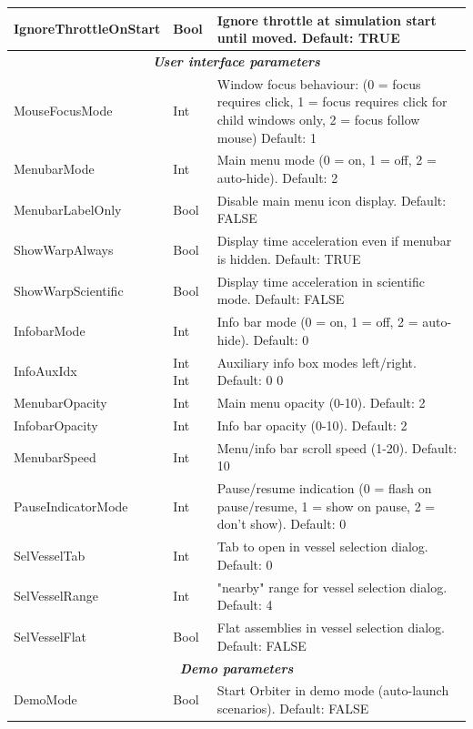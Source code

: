 \documentclass[Orbiter User Manual.tex]{subfiles}
\begin{document}
\begin{longtable}{ |p{}|p{}|p{}| }
	\hline\rule{0pt}{2ex}
	IgnoreThrottleOnStart & Bool & Ignore throttle at simulation start until moved. Default: TRUE\\
	\hline
	\multicolumn{3}{|c|}{\rule{0pt}{2ex}\textbf{\textit{User interface parameters}}}\\
	\hline\rule{0pt}{2ex}
	MouseFocusMode & Int & Window focus behaviour: (0 = focus requires click, 1 = focus requires click for child windows only, 2 = focus follow mouse) Default: 1\\
	\hline\rule{0pt}{2ex}
	MenubarMode & Int & Main menu mode (0 = on, 1 = off, 2 = auto-hide). Default: 2\\
	\hline\rule{0pt}{2ex}
	MenubarLabelOnly & Bool & Disable main menu icon display. Default: FALSE\\
	\hline\rule{0pt}{2ex}
	ShowWarpAlways & Bool & Display time acceleration even if menubar is hidden. Default: TRUE\\
	\hline\rule{0pt}{2ex}
	ShowWarpScientific & Bool & Display time acceleration in scientific mode. Default: FALSE\\
	\hline\rule{0pt}{2ex}
	InfobarMode & Int & Info bar mode (0 = on, 1 = off, 2 = auto-hide). Default: 0\\
	\hline\rule{0pt}{2ex}
	InfoAuxIdx & Int Int & Auxiliary info box modes left/right. Default: 0 0\\
	\hline\rule{0pt}{2ex}
	MenubarOpacity & Int & Main menu opacity (0-10). Default: 2\\
	\hline\rule{0pt}{2ex}
	InfobarOpacity & Int & Info bar opacity (0-10). Default: 2\\
	\hline\rule{0pt}{2ex}
	MenubarSpeed & Int & Menu/info bar scroll speed (1-20). Default: 10\\
	\hline\rule{0pt}{2ex}
	PauseIndicatorMode & Int & Pause/resume indication (0 = flash on pause/resume, 1 = show on pause, 2 = don't show). Default: 0\\
	\hline\rule{0pt}{2ex}
	SelVesselTab & Int & Tab to open in vessel selection dialog. Default: 0\\
	\hline\rule{0pt}{2ex}
	SelVesselRange & Int & "nearby" range for vessel selection dialog. Default: 4\\
	\hline\rule{0pt}{2ex}
	SelVesselFlat & Bool & Flat assemblies in vessel selection dialog. Default: FALSE\\
	\hline
	\multicolumn{3}{|c|}{\rule{0pt}{2ex}\textbf{\textit{Demo parameters}}}\\
	\hline\rule{0pt}{2ex}
	DemoMode & Bool & Start Orbiter in demo mode (auto-launch scenarios). Default: FALSE\\

\end{longtable}
\end{document}
